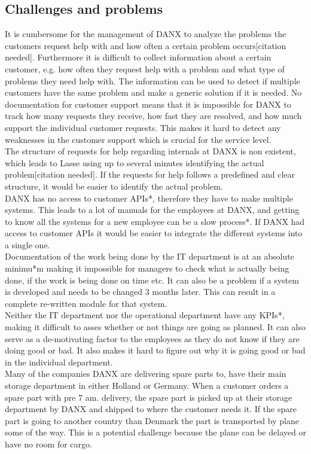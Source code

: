 \subsection{Challenges and problems}
It is cumbersome for the management of DANX to analyze the problems the customers request help with and how often a certain problem occurs[citation needed]. Furthermore it is difficult to collect information about a certain customer, e.g. how often they request help with a problem and what type of problems they need help with. The information can be used to detect if multiple customers have the same problem and make a generic solution if it is needed. No documentation for customer support means that it is impossible for DANX to track how many requests they receive, how fast they are resolved, and how much support the individual customer requests.
This makes it hard to detect any weaknesses in the customer support which is crucial for the service level. \\
The structure of requests for help regarding internals at DANX is non existent, which leads to Lasse using up to several minutes identifying the actual problem[citation needed]. If the requests for help follows a predefined and clear structure, it would be easier to identify the actual problem. \\
DANX has no access to customer APIs*, therefore they have to make multiple systems. This leads to a lot of manuals for the employees at DANX, and getting to know all the systems for a new employee can be a slow process*. If DANX had access to customer APIs it would be easier to integrate the different systems into a single one. \\
Documentation of the work being done by the IT department is at an absolute minimu*m making it impossible for managers to check what is actually being done, if the work is being done on time etc.
It can also be a problem if a system is developed and needs to be changed 3 months later. This can result in a complete re-written module for that system\cite{lahib001}. \\
Neither the IT department nor the operational department have any KPIs*, making it difficult to asses whether or not things are going as planned. It can also serve as a de-motivating factor to the employees as they do not know if they are doing good or bad. It also makes it hard to figure out why it is going good or bad in the individual department. \\
Many of the companies DANX are delivering spare parts to, have their main storage department in either Holland\cite{gert001} or Germany\cite{gert002}. When a customer orders a spare part with pre 7 am. delivery, the spare part is picked up at their storage department by DANX and shipped to where the customer needs it. If the spare part is going to another country than Denmark the part is transported by plane some of the way. This is a potential challenge because the plane can be delayed or have no room for cargo.

